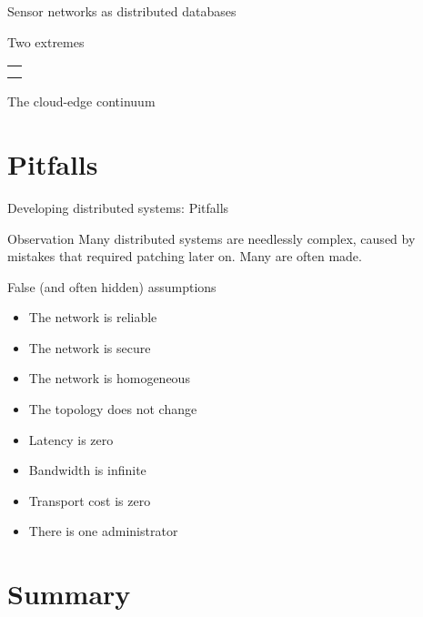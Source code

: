 \begin{slide}{Sensor networks as distributed databases}
  \begin{block}{Two extremes}
    \begin{center}
      \begin{tabular}{c}
        {01-16a} \\
        {01-16b} \\
      \end{tabular}
    \end{center}
  \end{block}
\end{slide}
\begin{slide}{The cloud-edge continuum}
  \begin{centerfig}
  \end{centerfig}
\end{slide}
\section{Pitfalls}
\begin{slide}{Developing distributed systems: Pitfalls}
  \begin{block}{Observation}
    Many distributed systems are needlessly complex, caused by mistakes that required patching later on. 
    Many  are often made.
  \end{block}
  \begin{block}{False (and often hidden) assumptions}
    \begin{itemize}
    \item<3-> The network is reliable
    \item<4-> The network is secure
    \item<5-> The network is homogeneous
    \item<6-> The topology does not change
    \item<7-> Latency is zero
    \item<8-> Bandwidth is infinite
    \item<9-> Transport cost is zero
    \item<10-> There is one administrator
    \end{itemize}
  \end{block}
\end{slide}
\section{Summary}
